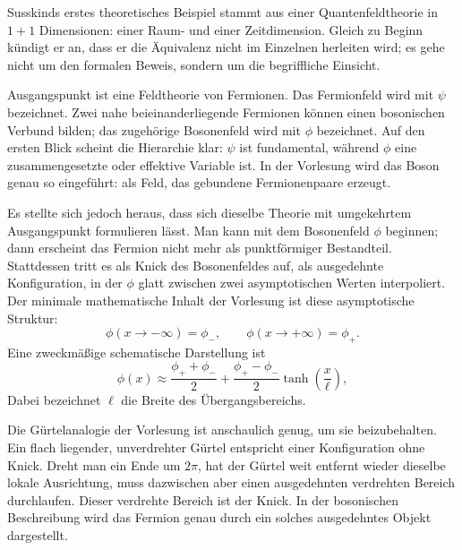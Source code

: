 Susskinds erstes theoretisches Beispiel stammt aus einer Quantenfeldtheorie in \(1+1\) Dimensionen: einer Raum- und einer Zeitdimension. Gleich zu Beginn kündigt er an, dass er die Äquivalenz nicht im Einzelnen herleiten wird; es gehe nicht um den formalen Beweis, sondern um die begriffliche Einsicht.

Ausgangspunkt ist eine Feldtheorie von Fermionen. Das Fermionfeld wird mit \(\psi\) bezeichnet. Zwei nahe beieinanderliegende Fermionen können einen bosonischen Verbund bilden; das zugehörige Bosonenfeld wird mit \(\phi\) bezeichnet. Auf den ersten Blick scheint die Hierarchie klar: \(\psi\) ist fundamental, während \(\phi\) eine zusammengesetzte oder effektive Variable ist. In der Vorlesung wird das Boson genau so eingeführt: als Feld, das gebundene Fermionenpaare erzeugt.

Es stellte sich jedoch heraus, dass sich dieselbe Theorie mit umgekehrtem Ausgangspunkt formulieren lässt. Man kann mit dem Bosonenfeld \(\phi\) beginnen; dann erscheint das Fermion nicht mehr als punktförmiger Bestandteil. Stattdessen tritt es als Knick des Bosonenfeldes auf, als ausgedehnte Konfiguration, in der \(\phi\) glatt zwischen zwei asymptotischen Werten interpoliert. Der minimale mathematische Inhalt der Vorlesung ist diese asymptotische Struktur:
\begin{equation}
\phi(x\to -\infty)=\phi_-,
\qquad
\phi(x\to +\infty)=\phi_+.
\end{equation}
Eine zweckmäßige schematische Darstellung ist
\begin{equation}
\phi(x)\approx \frac{\phi_++\phi_-}{2}
+
\frac{\phi_+-\phi_-}{2}\tanh\!\left(\frac{x}{\ell}\right),
\end{equation}
Dabei bezeichnet \(\ell\) die Breite des Übergangsbereichs.


Die Gürtelanalogie der Vorlesung ist anschaulich genug, um sie beizubehalten. Ein flach liegender, unverdrehter Gürtel entspricht einer Konfiguration ohne Knick. Dreht man ein Ende um \(2\pi\), hat der Gürtel weit entfernt wieder dieselbe lokale Ausrichtung, muss dazwischen aber einen ausgedehnten verdrehten Bereich durchlaufen. Dieser verdrehte Bereich ist der Knick. In der bosonischen Beschreibung wird das Fermion genau durch ein solches ausgedehntes Objekt dargestellt.

